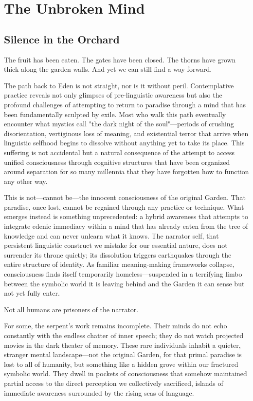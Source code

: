 \chapter{The Unbroken Mind}

\section{Silence in the Orchard}

The fruit has been eaten.
The gates have been closed.
The thorns have grown thick along the garden walls.
And yet we can still find a way forward.

The path back to Eden is not straight, nor is it without peril. Contemplative practice reveals not only glimpses of pre-linguistic awareness but also the profound challenges of attempting to return to paradise through a mind that has been fundamentally sculpted by exile. Most who walk this path eventually encounter what mystics call "the dark night of the soul"—periods of crushing disorientation, vertiginous loss of meaning, and existential terror that arrive when linguistic selfhood begins to dissolve without anything yet to take its place. This suffering is not accidental but a natural consequence of the attempt to access unified consciousness through cognitive structures that have been organized around separation for so many millennia that they have forgotten how to function any other way.

This is not—cannot be—the innocent consciousness of the original Garden. That paradise, once lost, cannot be regained through any practice or technique. What emerges instead is something unprecedented: a hybrid awareness that attempts to integrate edenic immediacy within a mind that has already eaten from the tree of knowledge and can never unlearn what it knows. The narrator self, that persistent linguistic construct we mistake for our essential nature, does not surrender its throne quietly; its dissolution triggers earthquakes through the entire structure of identity. As familiar meaning-making frameworks collapse, consciousness finds itself temporarily homeless—suspended in a terrifying limbo between the symbolic world it is leaving behind and the Garden it can sense but not yet fully enter.

Not all humans are prisoners of the narrator. 

For some, the serpent's work remains incomplete. Their minds do not echo constantly with the endless chatter of inner speech; they do not watch projected movies in the dark theater of memory. These rare individuals inhabit a quieter, stranger mental landscape—not the original Garden, for that primal paradise is lost to all of humanity, but something like a hidden grove within our fractured symbolic world. They dwell in pockets of consciousness that somehow maintained partial access to the direct perception we collectively sacrificed, islands of immediate awareness surrounded by the rising seas of language.

